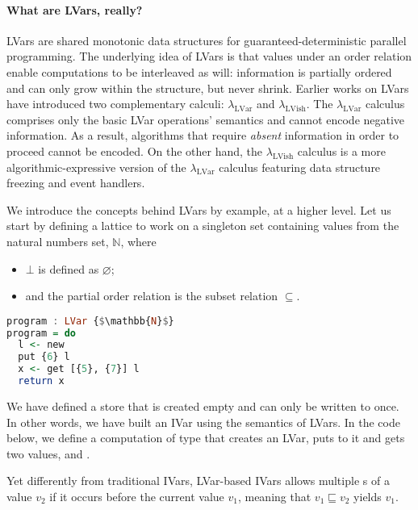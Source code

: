 \documentclass[main.tex]{subfiles}
\begin{document}
\paragraph{What are LVars, really?} LVars are shared monotonic data structures for guaranteed-deterministic parallel programming. The underlying idea of LVars is that values under an order relation enable computations to be interleaved as will: information is partially ordered and can only grow within the structure, but never shrink. Earlier works on LVars have introduced two complementary calculi: $\lambda_{\text{LVar}}$ and $\lambda_{\text{LVish}}$. The $\lambda_{\text{LVar}}$ calculus comprises only the basic LVar operations' semantics and cannot encode negative information. As a result, algorithms that require \textit{absent} information in order to proceed cannot be encoded. On the other hand, the $\lambda_{\text{LVish}}$ calculus is a more algorithmic-expressive version of the $\lambda_{\text{LVar}}$ calculus featuring data structure freezing and event handlers.

We introduce the concepts behind LVars by example, at a higher level. Let us start by defining a lattice to work on a singleton set containing values from the natural numbers set, $\mathbb{N}$, where
\begin{itemize}
\item $\bot$ is defined as $\varnothing$;
\item and the partial order relation is the subset relation $\subseteq$.
\end{itemize}

\begin{lstlisting}[language=Haskell]
program : LVar {$\mathbb{N}$}
program = do
  l <- new
  put {6} l
  x <- get [{5}, {7}] l
  return x
\end{lstlisting}

We have defined a store that is created empty and can only be written to once. In other words, we have built an IVar using the semantics of LVars. In the code below, we define a computation  of type  that creates an LVar, puts  to it and gets two values,  and .

Yet differently from traditional IVars, LVar-based IVars allows multiple s of a value $v_2$ if it occurs before the current value $v_1$, meaning that $v_1 \sqsubseteq v_2$ yields $v_1$.
\end{document}
